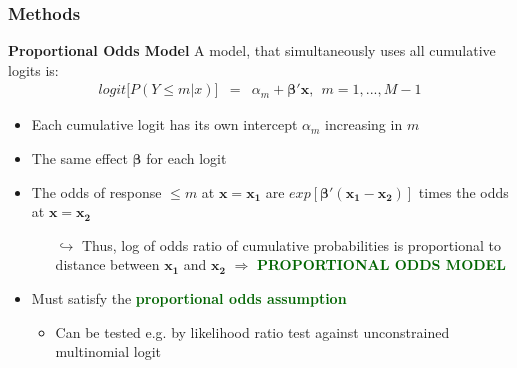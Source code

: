 \documentclass{beamer}              %
\begin{document}
\begin{frame}

\frametitle{Methods}\label{MethodsCumLog2} 
\textbf{Proportional Odds Model}
A model, that simultaneously uses all cumulative logits is:
\begin{equation}\label{PCumLog}
\begin{array}{lclcl}
logit  \big[P( Y \leq m| x) \big] &=& \alpha_m + \boldsymbol{\beta'x}, ~~m=1,...,M-1
\end{array}
\end{equation}
\hspace{-0.5cm}
\begin{itemize}
\item Each cumulative logit has its own intercept $\alpha_m$ increasing in $m$ 
\item The same effect $\boldsymbol{\beta}$ for each logit
\item The odds of response $\leq m$ at $\boldsymbol{x} = \boldsymbol{x_1}$ are $exp[\boldsymbol{\beta}'(\boldsymbol{x_1}-\boldsymbol{x_2})]$ times the odds at $\boldsymbol{x} = \boldsymbol{x_2}$
\\
\begin{itemize}
\item[$\boldsymbol{\hookrightarrow}$] Thus, log of odds ratio of cumulative probabilities is proportional to distance between $\boldsymbol{x_1}$ and $\boldsymbol{x_2}$ $\Rightarrow$ \textcolor{DarkGreen}{\textbf{PROPORTIONAL ODDS MODEL}}
\end{itemize}
\item Must satisfy the \textcolor{DarkGreen}{\textbf{proportional odds assumption}}
\begin{itemize}
\item Can be tested e.g. by likelihood ratio test against unconstrained multinomial logit
\end{itemize}
\end{itemize}
\end{frame}



\end{document}
